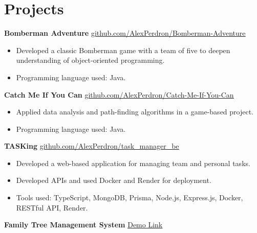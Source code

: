 \documentclass[10pt,a4paper]{article}
\begin{document}

\section*{Projects}

\noindent
\textbf{Bomberman Adventure}
  \hfill
\href{https://github.com/AlexPerdron/Bomberman-Adventure}
{\uline{github.com/AlexPerdron/Bomberman-Adventure}}

\begin{itemize}[leftmargin=*]
    \item Developed a classic Bomberman game with a team of five to deepen understanding of object-oriented programming.
    \item Programming language used: Java.
\end{itemize}

\vspace{0.2cm}

\noindent
\textbf{Catch Me If You Can}
\hfill
\href{https://github.com/AlexPerdron/Catch-Me-If-You-Can}
{\uline{github.com/AlexPerdron/Catch-Me-If-You-Can}}

\begin{itemize}[leftmargin=*]
    \item Applied data analysis and path-finding algorithms in a game-based project.
    \item Programming language used: Java.
\end{itemize}

\vspace{0.2cm}

\noindent
\textbf{TASKing}
\hfill
\href{https://github.com/AlexPerdron/task_manager_be}
{\uline{github.com/AlexPerdron/task\_manager\_be}}

\begin{itemize}[leftmargin=*]
    \item Developed a web-based application for managing team and personal tasks.
    \item Developed APIs and used Docker and Render for deployment.
    \item Tools used: TypeScript, MongoDB, Prisma, Node.js, Express.js, Docker, RESTful API, Render.
\end{itemize}

\vspace{0.2cm}

\noindent
\textbf{Family Tree Management System}
\hfill
\href{https://family-tree-frontend-adfa.onrender.com/}
{\uline{Demo Link}}
\end{document}
